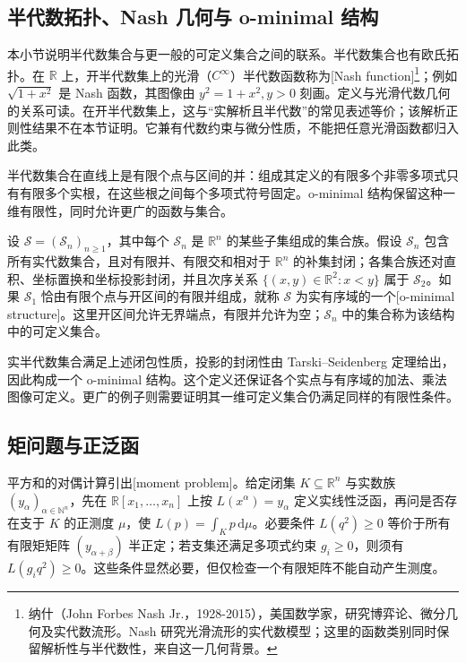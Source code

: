 \subsection{半代数拓扑、Nash 几何与 o-minimal 结构}
\label{b3:subsec:G05:03}

本小节说明半代数集合与更一般的可定义集合之间的联系。半代数集合也有欧氏拓扑。在 \(\mathbb R\) 上，开半代数集上的光滑（\(C^\infty\)）半代数函数称为[Nash function]\footnote{纳什（John Forbes Nash Jr.，1928-2015），美国数学家，研究博弈论、微分几何及实代数流形。Nash 研究光滑流形的实代数模型；这里的函数类别同时保留解析性与半代数性，来自这一几何背景。}；例如 \(\sqrt{1+x^2}\) 是 Nash 函数，其图像由 \(y^2=1+x^2,y>0\) 刻画。定义与光滑代数几何的关系可读\cite[Appendix B, Definitions B.2.3--B.2.4]{Mangolte2020RealAlgebraicVarieties}。在开半代数集上，这与“实解析且半代数”的常见表述等价；该解析正则性结果不在本节证明。它兼有代数约束与微分性质，不能把任意光滑函数都归入此类。

\ProseParagraphBreak
半代数集合在直线上是有限个点与区间的并：组成其定义的有限多个非零多项式只有有限多个实根，在这些根之间每个多项式符号固定。o-minimal 结构保留这种一维有限性，同时允许更广的函数与集合。

\begin{definition}\label{b3:def:real-o-minimal-structure}
	设 \(\mathcal S=(\mathcal S_n)_{n\ge1}\)，其中每个 \(\mathcal S_n\) 是 \(\mathbb R^n\) 的某些子集组成的集合族。假设 \(\mathcal S_n\) 包含所有实代数集合，且对有限并、有限交和相对于 \(\mathbb R^n\) 的补集封闭；各集合族还对直积、坐标置换和坐标投影封闭，并且次序关系 \(\{(x,y)\in\mathbb R^2:x<y\}\) 属于 \(\mathcal S_2\)。如果 \(\mathcal S_1\) 恰由有限个点与开区间的有限并组成，就称 \(\mathcal S\) 为实有序域的一个[o-minimal structure]。这里开区间允许无界端点，有限并允许为空；\(\mathcal S_n\) 中的集合称为该结构中的可定义集合。
\end{definition}

实半代数集合满足上述闭包性质，投影的封闭性由 Tarski--Seidenberg 定理给出，因此构成一个 o-minimal 结构。这个定义还保证各个实点与有序域的加法、乘法图像可定义。更广的例子则需要证明其一维可定义集合仍满足同样的有限性条件。

\subsection{矩问题与正泛函}
\label{b3:subsec:G05:moment}

平方和的对偶计算引出[moment problem]。给定闭集 \(K\subseteq\mathbb R^n\) 与实数族 \((y_\alpha)_{\alpha\in\mathbb N^n}\)，先在 \(\mathbb R[x_1,\ldots,x_n]\) 上按 \(L(x^\alpha)=y_\alpha\) 定义实线性泛函，再问是否存在支于 \(K\) 的正测度 \(\mu\)，使 \(L(p)=\int_Kp\,\mathrm{d}\mu\)。必要条件 \(L(q^2)\ge0\) 等价于所有有限矩矩阵 \((y_{\alpha+\beta})\) 半正定；若支集还满足多项式约束 \(g_i\ge0\)，则须有 \(L(g_iq^2)\ge0\)。这些条件显然必要，但仅检查一个有限矩阵不能自动产生测度。

